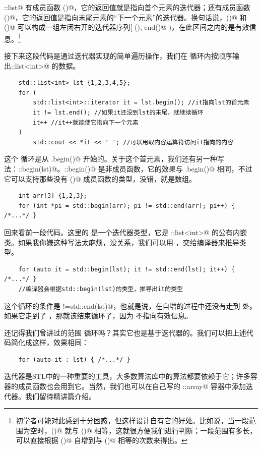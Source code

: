 \lstinline@std::list@ 有成员函数 \lstinline@begin()@，它的返回值就是指向首个元素的迭代器；还有成员函数 \lstinline@end()@，它的返回值是指向末尾元素的``下一个元素''的迭代器。换句话说，\lstinline@begin()@ 和 \lstinline@end()@ 可以构成一组左闭右开的迭代器序列$[$ \lstinline@begin(), end()@ $)$，在此区间之内的是有效信息。\footnote{初学者可能对此感到十分困惑，但这样设计自有它的好处。比如说，当一段范围为空时，\lstinline@begin()@ 就与 \lstinline@end()@ 相等，这就很方便我们进行判断；一段范围有多长，可以直接根据 \lstinline@begin()@ 自增到与 \lstinline@end()@ 相等的次数来得出。}\par
接下来这段代码是通过迭代器实现的简单遍历操作，我们在 \lstinline@for@ 循环内按顺序输出\newline\lstinline@std::list<int>@ 的数据。\par
\begin{lstlisting}
    std::list<int> lst {1,2,3,4,5};
    for (
        std::list<int>::iterator it = lst.begin(); //it指向lst的首元素
        it != lst.end(); //如果it还没到lst的末尾，就继续循环
        it++ //it++就能使它指向下一个元素
    )
        std::cout << *it << ' '; //可以用取内容运算符访问it指向的内容
\end{lstlisting}\par
这个 \lstinline@for@ 循环是从 \lstinline@lst.begin()@ 开始的。关于这个首元素，我们还有另一种写法：\newline\lstinline@std::begin(lst)@。\lstinline@std::begin()@ 是非成员函数，它的效果与 \lstinline@lst.begin()@ 相同，不过它可以支持那些没有 \lstinline@begin()@ 成员函数的类型，没错，就是数组。
\begin{lstlisting}
    int arr[3] {1,2,3};
    for (int *pi = std::begin(arr); pi != std::end(arr); pi++) { /*...*/ }
\end{lstlisting}\par
回来看前一段代码。这里的 \lstinline@it@ 是一个迭代器类型，它是 \lstinline@std::list<int>@ 的公有内嵌类。如果我你嫌这种写法太麻烦，没关系，我们可以用 \lstinline@auto@，交给编译器来推导类型。
\begin{lstlisting}
    for (auto it = std::begin(lst); it != std::end(lst); it++) { /*...*/ }
    //编译器会根据std::begin(lst)的类型，推导出it的类型
\end{lstlisting}
这个循环的条件是 \lstinline@it!=std::end(lst)@，也就是说，\lstinline@it@ 在自增的过程中还没有走到 \lstinline@end@ 处。如果它走到了 \lstinline@end@，那就该结束循环了，因为 \lstinline@end@ 不指向有效信息。\par
还记得我们曾讲过的范围 \lstinline@for@ 循环吗？其实它也是基于迭代器的。我们可以把上述代码简化成这样，效果相同：
\begin{lstlisting}
    for (auto it : lst) { /*...*/ }
\end{lstlisting}
迭代器是STL中的一种重要的工具，大多数算法库中的算法都要依赖于它；许多容器的成员函数也会用到它。当然，我们也可以在自己写的 \lstinline@user::array@ 容器中添加迭代器。我们留待精讲篇介绍。\par
